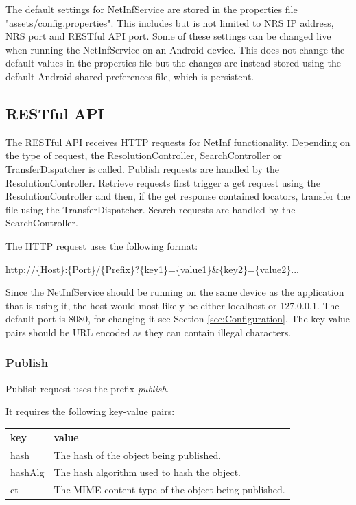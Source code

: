 The default settings for NetInfService are stored in the properties file "assets/config.properties". This includes but is not limited to NRS IP address, NRS port and RESTful API port. Some of these settings can be changed live when running the NetInfService on an Android device. This does not change the default values in the properties file but the changes are instead stored using the default Android shared preferences file, which is persistent.

\subsection{RESTful API}
\label{sec:RESTful API}

The RESTful API receives HTTP requests for NetInf functionality. Depending on the type of request, the ResolutionController, SearchController or TransferDispatcher is called. Publish requests are handled by the ResolutionController. Retrieve requests first trigger a get request using the ResolutionController and then, if the get response contained locators, transfer the file using the TransferDispatcher. Search requests are handled by the SearchController.

The HTTP request uses the following format:

\begin{center}
http://\{Host\}:\{Port\}/\{Prefix\}?\{key1\}=\{value1\}\&\{key2\}=\{value2\}...
\end{center}

Since the NetInfService should be running on the same device as the application that is using it, the host would most likely be either localhost or 127.0.0.1. The default port is 8080, for changing it see Section \ref{sec:Configuration}. The key-value pairs should be URL encoded as they can contain illegal characters.

\subsubsection{Publish}

Publish request uses the prefix \emph{publish}.

It requires the following key-value pairs:

\begin{tabular}{ | l | l | }
	\hline
	key & value  \\ \hline \hline
	hash & The hash of the object being published.  \\ \hline
	hashAlg & The hash algorithm used to hash the object. \\ \hline
	ct & The MIME content-type of the object being published. \\ \hline
\end{tabular}

